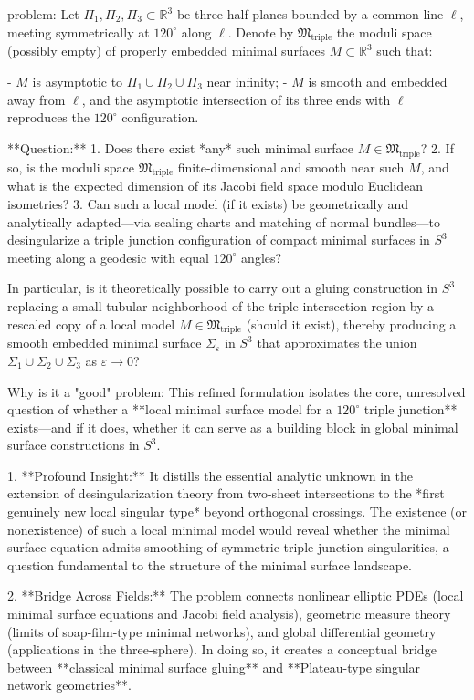 problem:  
Let $\Pi_1,\Pi_2,\Pi_3\subset \mathbb{R}^3$ be three half-planes bounded by a common line $\ell$, meeting symmetrically at $120^\circ$ along $\ell$. Denote by $\mathfrak{M}_{\text{triple}}$ the moduli space (possibly empty) of properly embedded minimal surfaces $M\subset \mathbb{R}^3$ such that:  

- $M$ is asymptotic to $\Pi_1\cup \Pi_2\cup \Pi_3$ near infinity;  
- $M$ is smooth and embedded away from $\ell$, and the asymptotic intersection of its three ends with $\ell$ reproduces the $120^\circ$ configuration.  

**Question:**  
1. Does there exist *any* such minimal surface $M\in \mathfrak{M}_{\text{triple}}$?  
2. If so, is the moduli space $\mathfrak{M}_{\text{triple}}$ finite-dimensional and smooth near such $M$, and what is the expected dimension of its Jacobi field space modulo Euclidean isometries?  
3. Can such a local model (if it exists) be geometrically and analytically adapted—via scaling charts and matching of normal bundles—to desingularize a triple junction configuration of compact minimal surfaces in $S^3$ meeting along a geodesic with equal $120^\circ$ angles?  

In particular, is it theoretically possible to carry out a gluing construction in $S^3$ replacing a small tubular neighborhood of the triple intersection region by a rescaled copy of a local model $M\in \mathfrak{M}_{\text{triple}}$ (should it exist), thereby producing a smooth embedded minimal surface $\Sigma_\varepsilon$ in $S^3$ that approximates the union $\Sigma_1\cup\Sigma_2\cup\Sigma_3$ as $\varepsilon\to 0$?  

Why is it a "good" problem:  
This refined formulation isolates the core, unresolved question of whether a **local minimal surface model for a $120^\circ$ triple junction** exists—and if it does, whether it can serve as a building block in global minimal surface constructions in $S^3$.  

1. **Profound Insight:**  
It distills the essential analytic unknown in the extension of desingularization theory from two-sheet intersections to the *first genuinely new local singular type* beyond orthogonal crossings. The existence (or nonexistence) of such a local minimal model would reveal whether the minimal surface equation admits smoothing of symmetric triple-junction singularities, a question fundamental to the structure of the minimal surface landscape.  

2. **Bridge Across Fields:**  
The problem connects nonlinear elliptic PDEs (local minimal surface equations and Jacobi field analysis), geometric measure theory (limits of soap-film-type minimal networks), and global differential geometry (applications in the three-sphere). In doing so, it creates a conceptual bridge between **classical minimal surface gluing** and **Plateau-type singular network geometries**.  

